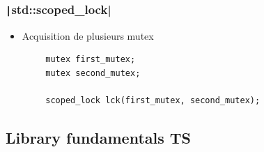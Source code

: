 \documentclass[C++.tex]{subfiles}
\begin{document}
\begin{frame}[fragile]
	\frametitle{\texttt|std::scoped_lock|}
	\begin{itemize}
		\item Acquisition de plusieurs mutex
	\end{itemize}

	\begin{verbatim}
		mutex first_mutex;
		mutex second_mutex;

		scoped_lock lck(first_mutex, second_mutex);
	\end{verbatim}
\end{frame}

\subsection*{Library fundamentals TS}
\end{document}
